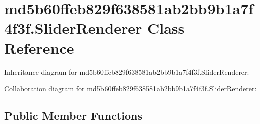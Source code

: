 \hypertarget{classmd5b60ffeb829f638581ab2bb9b1a7f4f3f_1_1_slider_renderer}{}\section{md5b60ffeb829f638581ab2bb9b1a7f4f3f.\+Slider\+Renderer Class Reference}
\label{classmd5b60ffeb829f638581ab2bb9b1a7f4f3f_1_1_slider_renderer}


Inheritance diagram for md5b60ffeb829f638581ab2bb9b1a7f4f3f.\+Slider\+Renderer\+:


Collaboration diagram for md5b60ffeb829f638581ab2bb9b1a7f4f3f.\+Slider\+Renderer\+:
\subsection*{Public Member Functions}
